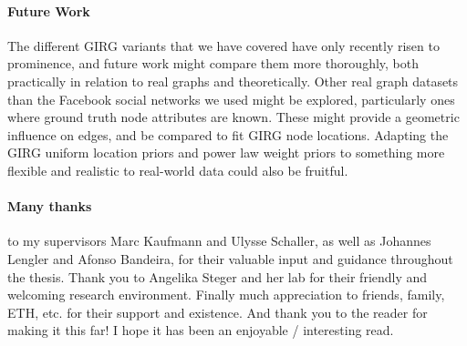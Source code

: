 
\paragraph{Future Work}
The different GIRG variants that we have covered have only recently risen to prominence, and future work might compare them more thoroughly, both practically in relation to real graphs and theoretically.
Other real graph datasets than the Facebook social networks we used might be explored, particularly ones where ground truth node attributes are known. These might provide a geometric influence on edges, and be compared to fit GIRG node locations.
Adapting the GIRG uniform location priors and power law weight priors to something more flexible and realistic to real-world data could also be fruitful.


\paragraph{Many thanks} to my supervisors Marc Kaufmann and Ulysse Schaller, as well as Johannes Lengler and Afonso Bandeira, for their valuable input and guidance throughout the thesis. Thank you to Angelika Steger and her lab for their friendly and welcoming research environment. Finally much appreciation to friends, family, ETH, etc. for their support and existence. And thank you to the reader for making it this far! I hope it has been an enjoyable / interesting read.





